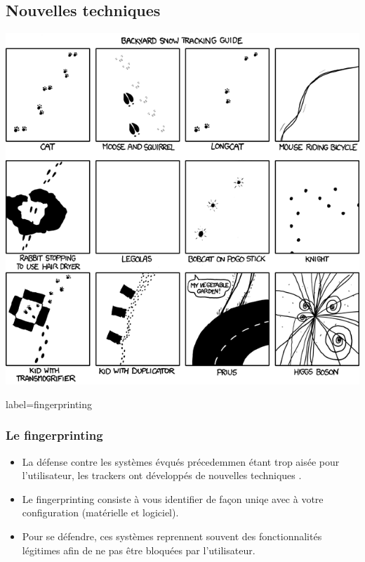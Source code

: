 \documentclass{beamer}
\begin{document}
    \subsection{Nouvelles techniques}
        \begin{frame}
            \begin{center}
                \includegraphics[scale=0.35]{img/snow_tracking.png}
            \end{center}
        \end{frame}
        \begin{frame}{label=fingerprinting}
            \frametitle{Le fingerprinting}
            \begin{center}
                \begin{itemize}
                    \item La défense contre les systèmes évqués précedemmen étant trop aisée pour l'utilisateur, les trackers ont développés de nouvelles techniques \citet{web}.
                    \item Le fingerprinting consiste à vous identifier de façon uniqe avec à votre configuration (matérielle et logiciel).
                    \item Pour se défendre, ces systèmes reprennent souvent des fonctionnalités légitimes afin de ne pas être bloquées par l'utilisateur.
                \end{itemize}
            \end{center}
        \end{frame}
\end{document}
